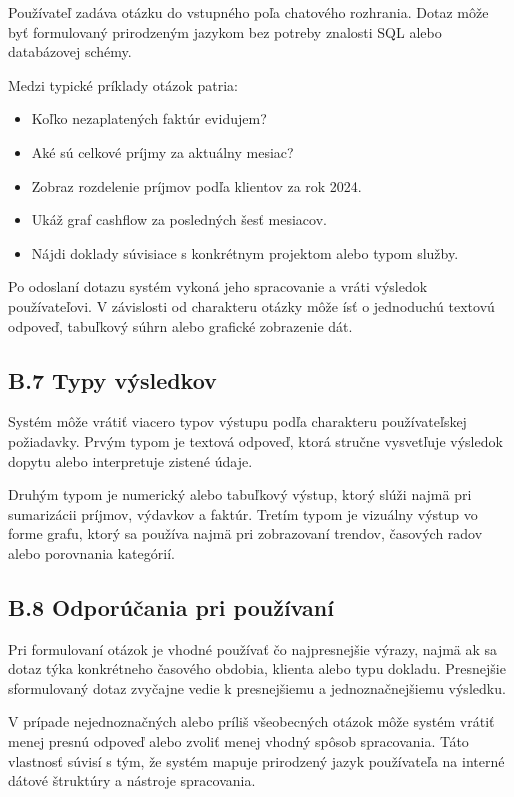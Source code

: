 Používateľ zadáva otázku do vstupného poľa chatového rozhrania. Dotaz môže byť
formulovaný prirodzeným jazykom bez potreby znalosti SQL alebo databázovej
schémy.

Medzi typické príklady otázok patria:
\begin{itemize}
	\item Koľko nezaplatených faktúr evidujem?

	\item Aké sú celkové príjmy za aktuálny mesiac?

	\item Zobraz rozdelenie príjmov podľa klientov za rok 2024.

	\item Ukáž graf cashflow za posledných šesť mesiacov.

	\item Nájdi doklady súvisiace s konkrétnym projektom alebo typom služby.
\end{itemize}

Po odoslaní dotazu systém vykoná jeho spracovanie a vráti výsledok používateľovi.
V závislosti od charakteru otázky môže ísť o jednoduchú textovú odpoveď,
tabuľkový súhrn alebo grafické zobrazenie dát.

\subsection*{B.7 Typy výsledkov}

Systém môže vrátiť viacero typov výstupu podľa charakteru používateľskej požiadavky.
Prvým typom je textová odpoveď, ktorá stručne vysvetľuje výsledok dopytu alebo interpretuje
zistené údaje.

Druhým typom je numerický alebo tabuľkový výstup, ktorý slúži najmä pri
sumarizácii príjmov, výdavkov a faktúr. Tretím typom je vizuálny výstup vo forme
grafu, ktorý sa používa najmä pri zobrazovaní trendov, časových radov alebo
porovnania kategórií.

\subsection*{B.8 Odporúčania pri používaní}

Pri formulovaní otázok je vhodné používať čo najpresnejšie výrazy, najmä ak sa
dotaz týka konkrétneho časového obdobia, klienta alebo typu dokladu. Presnejšie
sformulovaný dotaz zvyčajne vedie k presnejšiemu a jednoznačnejšiemu výsledku.

V prípade nejednoznačných alebo príliš všeobecných otázok môže systém vrátiť
menej presnú odpoveď alebo zvoliť menej vhodný spôsob spracovania. Táto vlastnosť
súvisí s tým, že systém mapuje prirodzený jazyk používateľa na interné dátové
štruktúry a nástroje spracovania.

